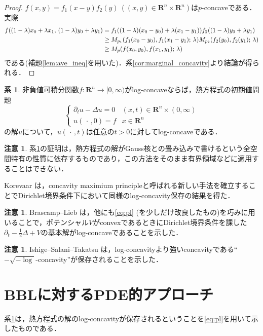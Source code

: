 \documentclass[a4j]{ltjsarticle}
\newcommand{\Rset}{\mathbf{R}}
\newcommand{\1}{\bm{1}}
\newcommand{\M}[4]{M_{#1}\qty(#2,#3;\,#4)}
\numberwithin{equation}{section}
\theoremstyle{definition}
\newtheorem{cor}[thm]{系}
\newtheorem{rmk}[thm]{注意}
\begin{document}
\begin{proof}
    $f(x,y)=f_1(x-y)f_2(y)\ ((x,y)\in \Rset^n\times\Rset^n)$は$p$-concaveである．実際
    \begin{align}
        f((1-\lambda)x_0+\lambda x_1,\,(1-\lambda)y_0+\lambda y_1)&=f_1((1-\lambda)(x_0-y_0)+\lambda(x_1-y_1))f_2((1-\lambda)y_0+\lambda y_1)\\
        &\geq \M{p_1}{f_1(x_0-y_0)}{f_1(x_1-y_1)}{\lambda}\M{p_2}{f_2(y_0)}{f_2(y_1)}{\lambda}\\
        &\geq \M{p}{f(x_0,y_0)}{f(x_1,y_1)}{\lambda}
    \end{align}
    である(補題\ref{lem:ave_ineq}を用いた)．系\ref{cor:marginal_concavity}より結論が得られる．
\end{proof}
\begin{cor}\label{cor:heat_concavity}
    非負値可積分関数$f\colon \Rset^n\to[0,\infty)$がlog-concaveならば，熱方程式の初期値問題
    \begin{equation}
        \left\{
        \begin{array}{rl}
            \partial_{t}u-\Delta u=0 & (x,t)\in\Rset^n\times (0,\infty)\\
            u(\,\cdot\,,0)=f & x\in\Rset^n
        \end{array}
        \right.
    \end{equation}
    の解$u$について，$u(\,\cdot\,,t)$は任意の$t>0$に対してlog-concaveである．
\end{cor}
\begin{rmk}
    系\ref{cor:heat_concavity}の証明は，熱方程式の解がGauss核との畳み込みで書けるという全空間特有の性質に依存するものであり，この方法をそのまま有界領域などに適用することはできない．

    Korevaar \cite{K}は，concavity maximium principleと呼ばれる新しい手法を確立することでDirichlet境界条件下において同様のlog-concavity保存の結果を得た．
\end{rmk}
\begin{rmk}
    Brascamp--Lieb \cite{BL}は，他にも\eqref{eq:pl} (を少しだけ改良したもの)を巧みに用いることで，ポテンシャル$V$がconvexであるときにDirichlet境界条件を課した$\partial_t-\frac{1}{2}\Delta +V$の基本解がlog-concaveであることを示した．
\end{rmk}
\begin{rmk}
    Ishige--Salani--Takatsu \cite{IST}は，log-concavityより強いconcavityである``$-\sqrt{-\log}$-concavity''が保存されることを示した．
\end{rmk}
\section{BBLに対するPDE的アプローチ}
系\ref{cor:heat_concavity}は，熱方程式の解のlog-concavityが保存されるということを\eqref{eq:pl}を用いて示したものである．
\end{document}
